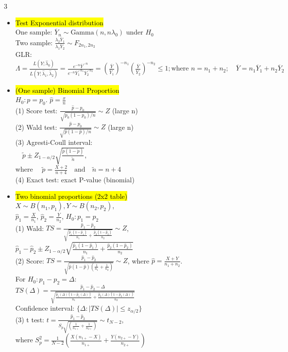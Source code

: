 \documentclass[a4paper,10pt]{article}
\begin{document}
\begin{multicols}{3}
\begin{itemize}
    \item \hl{Test Exponential distribution}\\
    One sample: $\overline{Y}_n \sim \text{Gamma}(n, n\lambda_0)$ under $H_0$\\
    Two sample: $\frac{\lambda_2 \overline{Y}_1}{\lambda_1 \overline{Y}_2} \sim F_{2n_1, 2n_2}$\\
    GLR: $\Lambda = \frac{L(Y; \hat{\lambda}_0)}{L(Y; \hat{\lambda}_1, \hat{\lambda}_2)} 
    = \frac{e^{-n} \overline{Y}^{-n}}{e^{-n} \overline{Y}_1^{-n_1}\overline{Y}_2^{-n_2}} 
    = \left(\frac{\overline{Y}}{\overline{Y}_1}\right)^{-n_1} \left(\frac{\overline{Y}}{\overline{Y}_2}\right)^{-n_2}\le 1; 
    \text{where } n = n_1 + n_2; \quad \overline{Y} = n_1 \overline{Y}_1 + n_2 \overline{Y}_2$
    
    \item \hl{(One sample) Binomial Proportion}\\
    $H_0:p=p_0$. $\hat{p}=\frac{x}{n}$\\
    (1) Score test: $\frac{\hat{p}-p_0}{\sqrt{p_0(1-p_0)/n}}\sim Z$ (large n)\\
    (2) Wald test: $\frac{\hat{p}-p_0}{\sqrt{\hat{p}(1-\hat{p})/n}}\sim Z$ (large n)\\
    (3) Agresti-Coull interval:\\ $\quad 
    \tilde{p} \pm Z_{1-\alpha/2} \sqrt{\frac{\tilde{p}(1-\tilde{p})}{\tilde{n}}}$, \\where $\quad \tilde{p} = \frac{X+2}{n+4} \quad \text{and} \quad \tilde{n} = n+4$\\
    (4) Exact test: exact P-value (binomial)
    \item \hl{Two binomial proportions (2x2 table)}\\
    $X\sim B(n_1,p_1),Y\sim B(n_2,p_2)$,\\ $\hat{p}_1=\frac{X}{n_1}$, $\hat{p}_2=\frac{Y}{n_2}$, $H_0:p_1=p_2$\\
    (1) Wald: $TS=\frac{\hat{p}_1-\hat{p}_2}{\sqrt{\frac{\hat{p}_1(1-\hat{p}_1)}{n_1}+\frac{\hat{p}_2(1-\hat{p}_2)}{n_2}}}\sim Z$, $\hat{p}_1 - \hat{p}_2 \pm Z_{1-\alpha/2} \sqrt{\frac{\hat{p}_1(1 - \hat{p}_1)}{n_1} + \frac{\hat{p}_2(1 - \hat{p}_2)}{n_2}}$\\
    (2) Score: $TS=\frac{\hat{p}_1-\hat{p}_2}{\sqrt{\hat{p}(1-\hat{p})(\frac{1}{n_1}+\frac{1}{n_2})}}\sim Z$, where $\hat{p}=\frac{X+Y}{n_1+n_2}$.\\
    For $H_0 : p_1 - p_2 = \Delta: $\\
    $TS(\Delta) = \frac{\hat{p}_1 - \hat{p}_2 - \Delta}{\sqrt{\frac{\hat{p}_1(\Delta)(1 - \hat{p}_1(\Delta))}{n_1} + \frac{\hat{p}_2(\Delta)(1 - \hat{p}_2(\Delta))}{n_2}}}
    $\\
    Confidence interval: $ \{ \Delta : |TS(\Delta)| \leq z_{\alpha/2} \}$\\
    (3) t test: $t = \frac{\hat{p}_1 - \hat{p}_2}{S_p \sqrt{\left(\frac{1}{n_{1+}} + \frac{1}{n_{2+}}\right)}}\sim t_{N-2}$,\\ where $S_p^2 = \frac{1}{N - 2} \left( \frac{X(n_{1+} - X)}{n_{1+}} + \frac{Y(n_{2+} - Y)}{n_{2+}} \right)$
    

\end{itemize}
\end{multicols}
\end{document}

